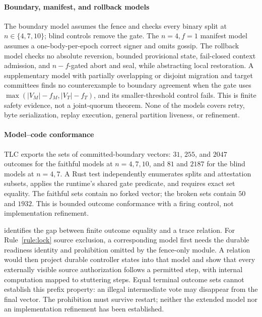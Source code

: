 \paragraph{Boundary, manifest, and rollback models}
The boundary model assumes the fence and checks every binary split at $n\in\{4,7,10\}$; blind
controls remove the gate. The $n=4,f=1$ manifest model assumes a one-body-per-epoch correct signer and
omits gossip. The rollback model checks no absolute reversion, bounded provisional state, fail-closed
context admission, and $n-f$-gated abort and seal, while abstracting local restoration. A supplementary
model with partially overlapping or disjoint migration and target committees finds no counterexample
to boundary agreement when the gate uses $\max(|V_M|-f_M,|V_T|-f_T)$, and its smaller-threshold control
fails. This is finite safety evidence, not a joint-quorum theorem. None of the models covers retry,
byte serialization, replay execution, general partition liveness, or refinement.

\paragraph{Model--code conformance}
TLC exports the sets of committed-boundary vectors: $31$, $255$, and $2047$ outcomes for the faithful
models at $n=4,7,10$, and $81$ and $2187$ for the blind models at $n=4,7$. A Rust test independently
enumerates splits and attestation subsets, applies the runtime's shared gate predicate, and requires
exact set equality. The faithful sets contain no forked vector; the broken sets contain $50$ and $1932$.
This is bounded outcome conformance with a firing control, not implementation refinement.

 identifies the gap between finite outcome equality and a trace
relation. For Rule~\ref{rule:lock} source exclusion, a corresponding model first needs the
durable readiness identity and prohibition omitted by the fence-only module. A relation would
then project durable controller states into that model and show that every externally visible
source authorization follows a permitted step, with internal computation mapped to stuttering
steps. Equal terminal outcome sets cannot establish this prefix property: an illegal intermediate
vote may disappear from the final vector. The prohibition must survive restart; neither the
extended model nor an implementation refinement has been established.


